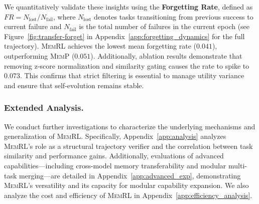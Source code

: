 \documentclass{article}
\theoremstyle{plain}
\theoremstyle{definition}
\theoremstyle{remark}
\begin{document}
We quantitatively validate these insights using the \textbf{Forgetting Rate}, defined as $FR = N_{\text{lost}} / N_{\text{fail}}$, where $N_{\text{lost}}$ denotes tasks transitioning from previous success to current failure and $N_{\text{fail}}$ is the total number of failures in the current epoch (see Figure~\ref{fig:transfer-forget} in Appendix~\ref{app:forgetting_dynamics} for the full trajectory). \textsc{MemRL} achieves the lowest mean forgetting rate ($0.041$), outperforming \textsc{MemP} ($0.051$). Additionally, ablation results demonstrate that removing z-score normalization and similarity gating causes the rate to spike to $0.073$. This confirms that strict filtering is essential to manage utility variance and ensure that self-evolution remains stable.
\subsubsection{Extended Analysis.} 
We conduct further investigations to characterize the underlying mechanisms and generalization of \textsc{MemRL}. Specifically, Appendix~\ref{app:analysis} analyzes \textsc{MemRL}'s role as a structural trajectory verifier and the correlation between task similarity and performance gains. Additionally, evaluations of advanced capabilities---including cross-model memory transferability and modular multi-task merging---are detailed in Appendix~\ref{app:advanced_exp}, demonstrating \textsc{MemRL}'s versatility and its capacity for modular capability expansion. We also analyze the cost and efficiency of \textsc{MemRL} in Appendix~\ref{app:efficiency_analysis}.




\end{document}

